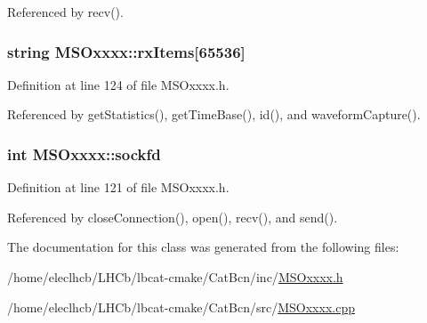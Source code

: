 Referenced by recv().\hypertarget{classMSOxxxx_a847cae37181e9ec5f481edcc3fb19b1a}{
\subsubsection[{rxItems}]{\setlength{\rightskip}{0pt plus 5cm}string {\bf MSOxxxx::rxItems}\mbox{[}65536\mbox{]}}}
\label{classMSOxxxx_a847cae37181e9ec5f481edcc3fb19b1a}


Definition at line 124 of file MSOxxxx.h.

Referenced by getStatistics(), getTimeBase(), id(), and waveformCapture().\hypertarget{classMSOxxxx_acf030a8f1ddd78d632816c856f50455c}{
\subsubsection[{sockfd}]{\setlength{\rightskip}{0pt plus 5cm}int {\bf MSOxxxx::sockfd}}}
\label{classMSOxxxx_acf030a8f1ddd78d632816c856f50455c}


Definition at line 121 of file MSOxxxx.h.

Referenced by closeConnection(), open(), recv(), and send().

The documentation for this class was generated from the following files:\begin{DoxyCompactItemize}
\item 
/home/eleclhcb/LHCb/lbcat-\/cmake/CatBcn/inc/\hyperlink{MSOxxxx_8h}{MSOxxxx.h}\item 
/home/eleclhcb/LHCb/lbcat-\/cmake/CatBcn/src/\hyperlink{MSOxxxx_8cpp}{MSOxxxx.cpp}\end{DoxyCompactItemize}
